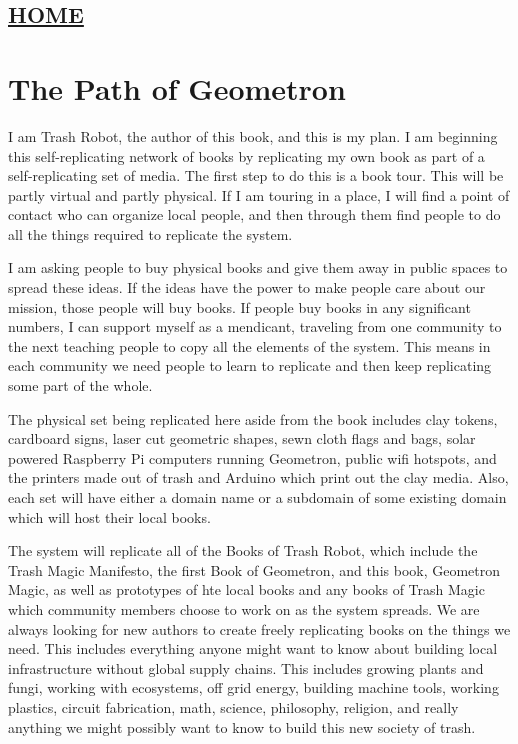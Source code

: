 \hypertarget{home}{%
\subsection{\texorpdfstring{\href{scrolls/home}{HOME}}{HOME}}\label{home}}

\hypertarget{the-path-of-geometron}{%
\section{The Path of Geometron}\label{the-path-of-geometron}}

I am Trash Robot, the author of this book, and this is my plan. I am
beginning this self-replicating network of books by replicating my own
book as part of a self-replicating set of media. The first step to do
this is a book tour. This will be partly virtual and partly physical. If
I am touring in a place, I will find a point of contact who can organize
local people, and then through them find people to do all the things
required to replicate the system.

I am asking people to buy physical books and give them away in public
spaces to spread these ideas. If the ideas have the power to make people
care about our mission, those people will buy books. If people buy books
in any significant numbers, I can support myself as a mendicant,
traveling from one community to the next teaching people to copy all the
elements of the system. This means in each community we need people to
learn to replicate and then keep replicating some part of the whole.

The physical set being replicated here aside from the book includes clay
tokens, cardboard signs, laser cut geometric shapes, sewn cloth flags
and bags, solar powered Raspberry Pi computers running Geometron, public
wifi hotspots, and the printers made out of trash and Arduino which
print out the clay media. Also, each set will have either a domain name
or a subdomain of some existing domain which will host their local
books.

The system will replicate all of the Books of Trash Robot, which include
the Trash Magic Manifesto, the first Book of Geometron, and this book,
Geometron Magic, as well as prototypes of hte local books and any books
of Trash Magic which community members choose to work on as the system
spreads. We are always looking for new authors to create freely
replicating books on the things we need. This includes everything anyone
might want to know about building local infrastructure without global
supply chains. This includes growing plants and fungi, working with
ecosystems, off grid energy, building machine tools, working plastics,
circuit fabrication, math, science, philosophy, religion, and really
anything we might possibly want to know to build this new society of
trash.

